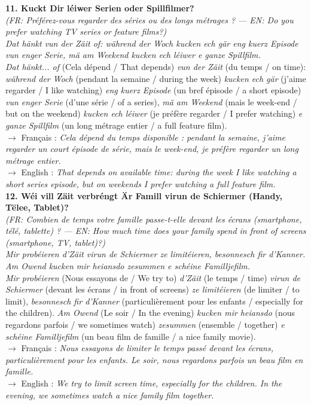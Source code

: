 \noindent\textbf{11. Kuckt Dir léiwer Serien oder Spillfilmer?}\\
\textit{(FR: Préférez-vous regarder des séries ou des longs métrages ? — EN: Do you prefer watching TV series or feature films?)}\\[0.3em]
\textit{Dat hänkt vun der Zäit of: während der Woch kucken ech gär eng kuerz Episode vun enger Serie, mä am Weekend kucken ech léiwer e ganze Spillfilm.}\\
\textit{Dat hänkt... of} (Cela dépend / That depends) \textit{vun der Zäit} (du temps / on time): \textit{während der Woch} (pendant la semaine / during the week) \textit{kucken ech gär} (j'aime regarder / I like watching) \textit{eng kuerz Episode} (un bref épisode / a short episode) \textit{vun enger Serie} (d'une série / of a series), \textit{mä am Weekend} (mais le week-end / but on the weekend) \textit{kucken ech léiwer} (je préfère regarder / I prefer watching) \textit{e ganze Spillfilm} (un long métrage entier / a full feature film).\\
$\rightarrow$ Français : \textit{Cela dépend du temps disponible : pendant la semaine, j'aime regarder un court épisode de série, mais le week-end, je préfère regarder un long métrage entier.}\\
$\rightarrow$ English : \textit{That depends on available time: during the week I like watching a short series episode, but on weekends I prefer watching a full feature film.}\\[0.8em]

\noindent\textbf{12. Wéi vill Zäit verbréngt Är Famill virun de Schiermer (Handy, Tëlee, Tablet)?}\\
\textit{(FR: Combien de temps votre famille passe-t-elle devant les écrans (smartphone, télé, tablette) ? — EN: How much time does your family spend in front of screens (smartphone, TV, tablet)?)}\\[0.3em]
\textit{Mir probéieren d'Zäit virun de Schiermer ze limitéieren, besonnesch fir d'Kanner. Am Owend kucken mir heiansdo zesummen e schéine Familljefilm.}\\
\textit{Mir probéieren} (Nous essayons de / We try to) \textit{d'Zäit} (le temps / time) \textit{virun de Schiermer} (devant les écrans / in front of screens) \textit{ze limitéieren} (de limiter / to limit), \textit{besonnesch fir d'Kanner} (particulièrement pour les enfants / especially for the children). \textit{Am Owend} (Le soir / In the evening) \textit{kucken mir heiansdo} (nous regardons parfois / we sometimes watch) \textit{zesummen} (ensemble / together) \textit{e schéine Familljefilm} (un beau film de famille / a nice family movie).\\
$\rightarrow$ Français : \textit{Nous essayons de limiter le temps passé devant les écrans, particulièrement pour les enfants. Le soir, nous regardons parfois un beau film en famille.}\\
$\rightarrow$ English : \textit{We try to limit screen time, especially for the children. In the evening, we sometimes watch a nice family film together.}

